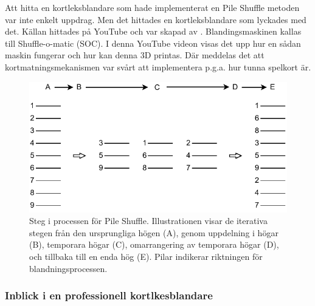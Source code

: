 \documentclass[swedish,a4paper]{article}
\begin{document}
Att hitta en kortleksblandare som hade implementerat en Pile Shuffle metoden var
inte enkelt uppdrag. Men det hittades en kortleksblandare som lyckades med det.
Källan hittades på YouTube  och var skapad av \textcite{3DprintedLife2021}.
Blandingsmaskinen kallas till Shuffle-o-matic (SOC). I denna YouTube videon visas
det upp hur en sådan maskin fungerar och hur kan denna 3D printas.  Där meddelas
det att kortmatningsmekanismen var svårt att implementera p.g.a. hur tunna
spelkort är.

\begin{figure}[H]
	\begin{center}
		\includegraphics{images/pile_shuffle.pdf}
	\end{center}
	\captionsetup{justification=centering,margin=4cm}
	\caption{Steg i processen för Pile Shuffle. Illustrationen visar de
	iterativa stegen från den ursprungliga högen (A), genom uppdelning i
	högar (B), temporara högar (C), omarrangering av temporara högar (D),
	och tillbaka till en enda hög (E). Pilar indikerar riktningen för
	blandningsprocessen.
	}
	\label{fig:pile_shuffle}
\end{figure}


\subsubsection{Inblick i en professionell kortlkesblandare}
\label{sec:wheel}
\end{document}
